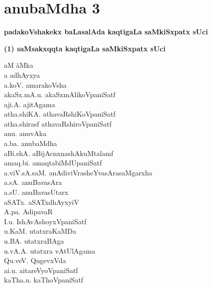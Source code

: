 \chapter*{anubaMdha 3}

\lhead[]{}
\rhead[]{}

\begin{center}
{\huge\bf padakoVshakekx baLasalAda kaqtigaLa saMkiSxpatx sUci}
\end{center}

\medskip

\begin{center}
{\large\bf (1) saMsakxqqta kaqtigaLa saMkiSxpatx sUci}
\end{center}

{
\setlength{\columnseprule}{1pt} 
\begin{multicols}{2}
\begin{tabbing}
aM\hspace{3cm} \= aMka\\[2pt]
a \> adhAyxya\\[2pt]
a.koV. \> amarakoVsha\\[2pt]
akaSx.mA.u. \> akaSxmAlikoVpaniSatf\\[2pt]
aji.A. \> ajitAgama\\[2pt]
atha.shiKA. \> athavaRshiKoVpaniSatf\\[2pt]
atha.shirasf \> athavaRshiroVpaniSatf\\[2pt]
anu. \> anuvAka\\[2pt]
a.ba. \> anubaMdha\\[2pt]
aBi.shA. \> aBijAcnxnashAkuMtalamf\\[2pt]
amaq.bi. \> amaqtabiMdUpaniSatf\\[2pt]
a.viV.sA.saM. \> anAdiviVrasheYvasArasaMgarxha\\[2pt]
a.sA. \> anuBavasAra\\[2pt]
a.sU. \> anuBavasUtarx\\[2pt]
aSATx. \> aSATxdhAyxyiV\\[2pt]
A.pa. \> AdipavaR\\[2pt]
I.u. \> IshAvAshoyxVpaniSatf\\[2pt]
u.KaM. \> utatxraKaMDa\\[2pt]
u.BA. \> utatxraBAga\\[2pt]
u.vA.A. \> utatxra vAtUlAgama\\[2pt]
Qu.veV. \> QugevxVda\\[2pt]
ai.u. \> aitareVyoVpaniSatf\\[2pt]
kaTha.u. \> kaThoVpaniSatf\\[2pt]

\end{tabbing}
\end{multicols}}
